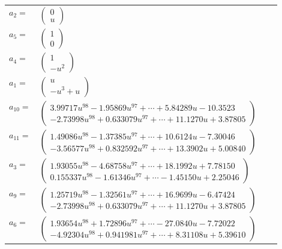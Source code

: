 \documentclass[1p]{elsarticle_modified}
\theoremstyle{definition}
\begin{document}
\begin{tabular}{m{7pt} m{180pt} m{7pt} m{180pt} }
\flushright $a_{2}=$&$\begin{pmatrix}0\\u\end{pmatrix}$ \\
\flushright $a_{5}=$&$\begin{pmatrix}1\\0\end{pmatrix}$ \\
\flushright $a_{4}=$&$\begin{pmatrix}1\\- u^2\end{pmatrix}$ \\
\flushright $a_{1}=$&$\begin{pmatrix}u\\- u^3+u\end{pmatrix}$ \\
\flushright $a_{10}=$&$\begin{pmatrix}3.99717 u^{98}-1.95869 u^{97}+\cdots+5.84289 u-10.3523\\-2.73998 u^{98}+0.633079 u^{97}+\cdots+11.1270 u+3.87805\end{pmatrix}$ \\
\flushright $a_{11}=$&$\begin{pmatrix}1.49086 u^{98}-1.37385 u^{97}+\cdots+10.6124 u-7.30046\\-3.56577 u^{98}+0.832592 u^{97}+\cdots+13.3902 u+5.00840\end{pmatrix}$ \\
\flushright $a_{3}=$&$\begin{pmatrix}1.93055 u^{98}-4.68758 u^{97}+\cdots+18.1992 u+7.78150\\0.155337 u^{98}-1.61346 u^{97}+\cdots-1.45150 u+2.25046\end{pmatrix}$ \\
\flushright $a_{9}=$&$\begin{pmatrix}1.25719 u^{98}-1.32561 u^{97}+\cdots+16.9699 u-6.47424\\-2.73998 u^{98}+0.633079 u^{97}+\cdots+11.1270 u+3.87805\end{pmatrix}$ \\
\flushright $a_{6}=$&$\begin{pmatrix}1.93654 u^{98}+1.72896 u^{97}+\cdots-27.0840 u-7.72022\\-4.92304 u^{98}+0.941981 u^{97}+\cdots+8.31108 u+5.39610\end{pmatrix}$ \\

\end{tabular}
\end{document}
